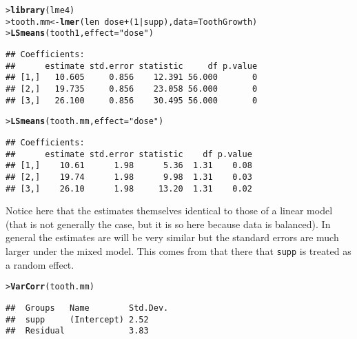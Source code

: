\documentclass[11pt]{article}\usepackage[]{graphicx}\usepackage[]{color}
\makeatletter
\newcommand{\hlnum}[1]{\textcolor[rgb]{0.686,0.059,0.569}{#1}}%
\newcommand{\hlstr}[1]{\textcolor[rgb]{0.192,0.494,0.8}{#1}}%
\newcommand{\hlopt}[1]{\textcolor[rgb]{0,0,0}{#1}}%
\newcommand{\hlstd}[1]{\textcolor[rgb]{0.345,0.345,0.345}{#1}}%
\newcommand{\hlkwb}[1]{\textcolor[rgb]{0.69,0.353,0.396}{#1}}%
\newcommand{\hlkwc}[1]{\textcolor[rgb]{0.333,0.667,0.333}{#1}}%
\newcommand{\hlkwd}[1]{\textcolor[rgb]{0.737,0.353,0.396}{\textbf{#1}}}%
\newenvironment{kframe}{%
 \def\at@end@of@kframe{}%
 \ifinner\ifhmode%
  \def\at@end@of@kframe{\end{minipage}}%
  \begin{minipage}{\columnwidth}%
 \fi\fi%
 \def\FrameCommand##1{\hskip\@totalleftmargin \hskip-\fboxsep
 \colorbox{shadecolor}{##1}\hskip-\fboxsep
     \hskip-\linewidth \hskip-\@totalleftmargin \hskip\columnwidth}%
 \MakeFramed {\advance\hsize-\width
   \@totalleftmargin\z@ \linewidth\hsize
   \@setminipage}}%
 {\par\unskip\endMakeFramed%
 \at@end@of@kframe}
\newenvironment{knitrout}{}{} %
\def\code#1{\texttt{#1}}
\renewenvironment{knitrout}{
  \begin{oldknitrout}
    \footnotesize
    \topsep=0pt
}{
  \end{oldknitrout}
}
\makeatother
\begin{document}
\begin{knitrout}
\color{fgcolor}\begin{kframe}
\begin{alltt}
\hlstd{> }\hlkwd{library}\hlstd{(lme4)}
\hlstd{> }\hlstd{tooth.mm} \hlkwb{<-} \hlkwd{lmer}\hlstd{( len} \hlopt{~} \hlstd{dose}  \hlopt{+} \hlstd{(}\hlnum{1}\hlopt{|}\hlstd{supp),} \hlkwc{data}\hlstd{=ToothGrowth)}
\hlstd{> }\hlkwd{LSmeans}\hlstd{(tooth1,} \hlkwc{effect}\hlstd{=}\hlstr{"dose"}\hlstd{)}
\end{alltt}
\begin{verbatim}
## Coefficients:
##      estimate std.error statistic     df p.value
## [1,]   10.605     0.856    12.391 56.000       0
## [2,]   19.735     0.856    23.058 56.000       0
## [3,]   26.100     0.856    30.495 56.000       0
\end{verbatim}
\begin{alltt}
\hlstd{> }\hlkwd{LSmeans}\hlstd{(tooth.mm,} \hlkwc{effect}\hlstd{=}\hlstr{"dose"}\hlstd{)}
\end{alltt}
\begin{verbatim}
## Coefficients:
##      estimate std.error statistic    df p.value
## [1,]    10.61      1.98      5.36  1.31    0.08
## [2,]    19.74      1.98      9.98  1.31    0.03
## [3,]    26.10      1.98     13.20  1.31    0.02
\end{verbatim}
\end{kframe}
\end{knitrout}


Notice here that the estimates themselves identical to those of a
linear model (that is not generally the case, but it is so here
because data is balanced). In general the estimates are will be 
very similar but the standard errors are much larger under the mixed model.
This comes from that
there that \code{supp} is treated as a random effect.

\begin{knitrout}
\color{fgcolor}\begin{kframe}
\begin{alltt}
\hlstd{> }\hlkwd{VarCorr}\hlstd{(tooth.mm)}
\end{alltt}
\begin{verbatim}
##  Groups   Name        Std.Dev.
##  supp     (Intercept) 2.52    
##  Residual             3.83
\end{verbatim}
\end{kframe}
\end{knitrout}
\end{document}

